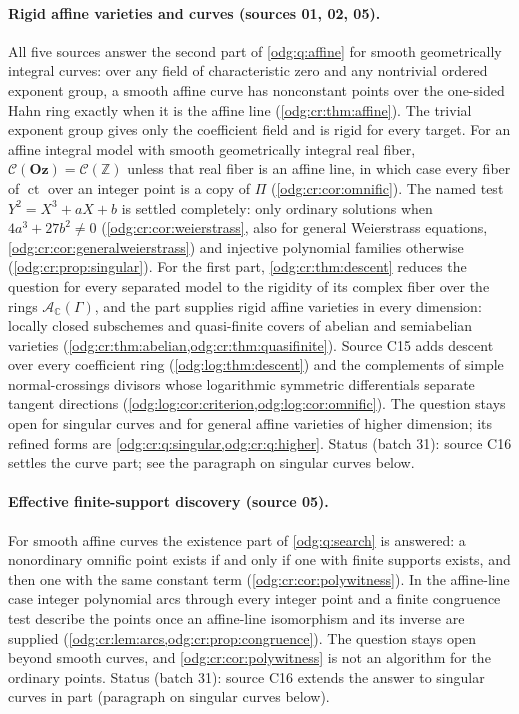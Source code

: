 \documentclass[11pt,oneside]{article}
\numberwithin{equation}{section}
\theoremstyle{definition}
\theoremstyle{remark}
\newcommand{\Oz}{\mathbf{Oz}}
\newcommand{\Z}{\mathbb Z}
\newcommand{\C}{\mathbb C}
\newcommand{\ct}{\operatorname{ct}}
\begin{document}
\paragraph{Rigid affine varieties and curves (sources 01, 02, 05).} All five
sources answer the second part of \cref{odg:q:affine} for smooth geometrically
integral curves: over any field of characteristic zero and any nontrivial
ordered exponent group, a smooth affine curve has nonconstant points over
the one-sided Hahn ring exactly when
it is the affine line (\cref{odg:cr:thm:affine}). The trivial exponent
group gives only the coefficient field and is rigid for every target.
For an affine integral model with smooth geometrically integral real fiber, $\mathcal C(\Oz)=\mathcal C(\Z)$ unless that real fiber is an
affine line, in which case every fiber of $\ct$ over an integer point is a copy of
$\Pi$ (\cref{odg:cr:cor:omnific}). The named test $Y^2=X^3+aX+b$ is settled
completely: only ordinary solutions when $4a^3+27b^2\ne0$
(\cref{odg:cr:cor:weierstrass}, also for general Weierstrass equations,
\cref{odg:cr:cor:generalweierstrass}) and injective polynomial families otherwise
(\cref{odg:cr:prop:singular}). For the first part, \cref{odg:cr:thm:descent}
reduces the question for every separated model to the rigidity of its complex fiber
over the rings $\mathcal A_\C(\Gamma)$, and the part supplies rigid affine varieties
in every dimension: locally closed subschemes and quasi-finite covers of abelian and
semiabelian varieties (\cref{odg:cr:thm:abelian,odg:cr:thm:quasifinite}). Source C15
adds descent over every coefficient ring (\cref{odg:log:thm:descent}) and the
complements of simple normal-crossings divisors whose logarithmic symmetric differentials
separate tangent directions (\cref{odg:log:cor:criterion,odg:log:cor:omnific}). The
question stays open for singular curves and for general affine varieties of higher
dimension; its refined forms are \cref{odg:cr:q:singular,odg:cr:q:higher}. Status
(batch 31): source C16 settles the curve part; see the paragraph on singular curves
below.

\paragraph{Effective finite-support discovery (source 05).} For smooth affine curves
the existence part of \cref{odg:q:search} is answered: a nonordinary omnific point
exists if and only if one with finite supports exists, and then one with the same
constant term (\cref{odg:cr:cor:polywitness}). In the affine-line case integer
polynomial arcs through every integer point and a finite congruence test describe
the points once an affine-line isomorphism and its inverse are supplied
(\cref{odg:cr:lem:arcs,odg:cr:prop:congruence}). The question stays open beyond
smooth curves, and \cref{odg:cr:cor:polywitness} is not an algorithm for the ordinary
points. Status (batch 31): source C16 extends the answer to singular curves in part
(paragraph on singular curves below).
\end{document}
